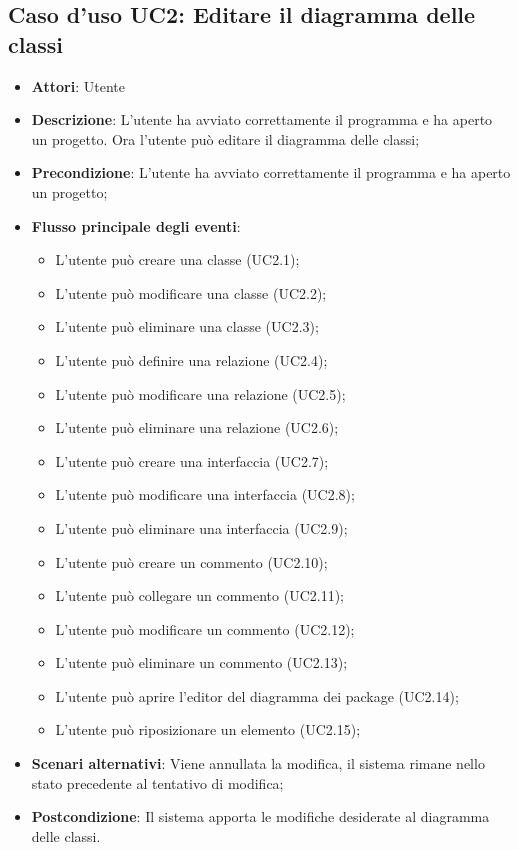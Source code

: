 \documentclass[../AnalisiDeiRequisiti.tex]{subfiles}
\begin{document}
	\subsection{Caso d'uso UC2: Editare il diagramma delle classi}
	\begin{itemize}
		\item \textbf{Attori}: Utente
		\item \textbf{Descrizione}: L'utente ha avviato correttamente il programma e ha aperto un progetto. Ora l'utente può editare il diagramma delle classi;
		\item \textbf{Precondizione}: L'utente ha avviato correttamente il programma e ha aperto un progetto;
		\item \textbf{Flusso principale degli eventi}: \begin{itemize}
			\item L'utente può creare una classe (UC2.1);
			\item L'utente può modificare una classe (UC2.2);
			\item L'utente può eliminare una classe (UC2.3);
			\item L'utente può definire una relazione (UC2.4);
			\item L'utente può modificare una relazione (UC2.5);
			\item L'utente può eliminare una relazione (UC2.6);
			\item L'utente può creare una interfaccia (UC2.7);
			\item L'utente può modificare una interfaccia (UC2.8);
			\item L'utente può eliminare una interfaccia (UC2.9);
			\item L'utente può creare un commento (UC2.10);
			\item L'utente può collegare un commento (UC2.11);
			\item L'utente può modificare un commento (UC2.12);
			\item L'utente può eliminare un commento (UC2.13);
			\item L'utente può aprire l'editor del diagramma dei package (UC2.14);
			\item L'utente può riposizionare un elemento (UC2.15);
		\end{itemize}
		\item \textbf{Scenari alternativi}: Viene annullata la modifica, il sistema rimane nello stato precedente al tentativo di modifica;
		\item \textbf{Postcondizione}: Il sistema apporta le modifiche desiderate al diagramma delle classi.
	\end{itemize}
\end{document}
